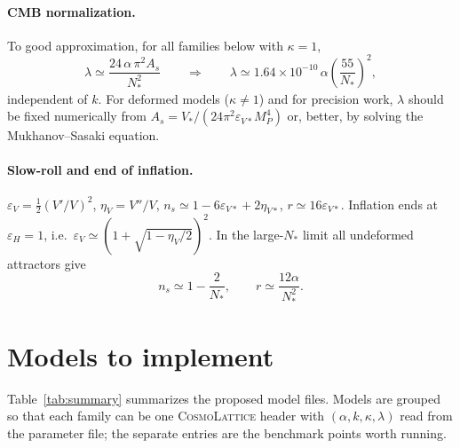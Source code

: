 \documentclass[11pt,a4paper]{article}
\newcommand{\MP}{M_P}
\newcommand{\aatt}{\alpha}
\begin{document}
\paragraph{CMB normalization.} To good approximation, for all families below with $\kappa=1$,
\begin{equation}
\lambda \simeq \frac{24\,\aatt\,\pi^2 A_s}{N_*^2}
\qquad\Rightarrow\qquad
\lambda \simeq 1.64\times 10^{-10}\,\aatt\left(\frac{55}{N_*}\right)^2 ,
\label{eq:lambda}
\end{equation}
independent of $k$. For deformed models ($\kappa\neq 1$) and for precision work, $\lambda$ should be fixed numerically from $A_s = V_*/(24\pi^2\varepsilon_{V*}\MP^4)$ or, better, by solving the Mukhanov--Sasaki equation.

\paragraph{Slow-roll and end of inflation.}
$\varepsilon_V = \tfrac12 (V'/V)^2$, $\eta_V = V''/V$, $n_s\simeq 1-6\varepsilon_{V*}+2\eta_{V*}$, $r\simeq 16\varepsilon_{V*}$. Inflation ends at $\varepsilon_H=1$, i.e.\ $\varepsilon_V\simeq(1+\sqrt{1-\eta_V/2})^2$. In the large-$N_*$ limit all undeformed attractors give
\begin{equation}
n_s\simeq 1-\frac{2}{N_*}, \qquad r\simeq \frac{12\aatt}{N_*^2}.
\end{equation}

\section{Models to implement}
\label{sec:models}

Table~\ref{tab:summary} summarizes the proposed model files. Models are grouped so that each family can be one \textsc{CosmoLattice} header with $(\aatt,k,\kappa,\lambda)$ read from the parameter file; the separate entries are the benchmark points worth running.
\end{document}
